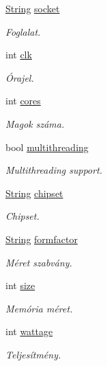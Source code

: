 \begin{DoxyCompactItemize}
\mbox{\hyperlink{class_string}{String}} \mbox{\hyperlink{struct_temp_input_a5142af446776f87e454134511f681887}{socket}}
\begin{DoxyCompactList}\small\item\em Foglalat. \end{DoxyCompactList}\item 
int \mbox{\hyperlink{struct_temp_input_aa76fe14a614fef6e9239ce2283d6b102}{clk}}
\begin{DoxyCompactList}\small\item\em Órajel. \end{DoxyCompactList}\item 
int \mbox{\hyperlink{struct_temp_input_a9b99532e6c984fb19c34ed943a6d5750}{cores}}
\begin{DoxyCompactList}\small\item\em Magok száma. \end{DoxyCompactList}\item 
bool \mbox{\hyperlink{struct_temp_input_ad8957d3af0ed714844abf3f37cbfc719}{multithreading}}
\begin{DoxyCompactList}\small\item\em Multithreading support. \end{DoxyCompactList}\item 
\mbox{\hyperlink{class_string}{String}} \mbox{\hyperlink{struct_temp_input_a29da394f96dae5eaa49e145207362a9c}{chipset}}
\begin{DoxyCompactList}\small\item\em Chipset. \end{DoxyCompactList}\item 
\mbox{\hyperlink{class_string}{String}} \mbox{\hyperlink{struct_temp_input_a402c6984d9e94d4c76e460d0368613f3}{formfactor}}
\begin{DoxyCompactList}\small\item\em Méret szabvány. \end{DoxyCompactList}\item 
int \mbox{\hyperlink{struct_temp_input_adfc0eb32fac7de584c3872875b452550}{size}}
\begin{DoxyCompactList}\small\item\em Memória méret. \end{DoxyCompactList}\item 
int \mbox{\hyperlink{struct_temp_input_a2764957397bba59e827c66aeb1821279}{wattage}}
\begin{DoxyCompactList}\small\item\em Teljesítmény. \end{DoxyCompactList}\item 

\end{DoxyCompactItemize}
